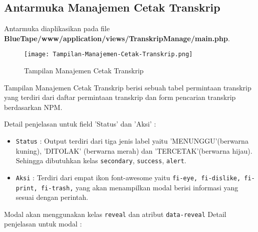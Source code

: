 \subsection{Antarmuka Manajemen Cetak Transkrip}
Antarmuka diaplikasikan pada file \textbf{BlueTape/www/application/views/TranskripManage/main.php}.
\begin{figure} [H]
	\centering  
	\texttt{[image: Tampilan-Manajemen-Cetak-Transkrip.png]}  
	\caption{Tampilan Manajemen Cetak Transkrip} 	
\end{figure}

Tampilan Manajemen Cetak Transkrip berisi sebuah tabel permintaan transkrip yang terdiri dari daftar permintaan transkrip dan form pencarian transkrip berdasarkan NPM. \par

\noindent Detail penjelasan untuk field 'Status' dan 'Aksi' :
\begin{itemize}
	\item \texttt{Status} : Output terdiri dari tiga jenis label yaitu 'MENUNGGU'(berwarna kuning), 'DITOLAK' (berwarna merah) dan 'TERCETAK'(berwarna hijau).  Sehingga dibutuhkan kelas \colorbox{mygray}{\verb|secondary|}, \colorbox{mygray}{\verb|success|}, \colorbox{mygray}{\verb|alert|}. 
	\item \texttt{Aksi} : Terdiri dari empat ikon font-awesome yaitu \verb|fi-eye, fi-dislike, fi-print, fi-trash,| yang akan menampilkan modal berisi informasi yang sesuai dengan perintah.
\end{itemize}
Modal akan menggunakan kelas \texttt{reveal} dan atribut \texttt{data-reveal} Detail penjelasan untuk modal : 

